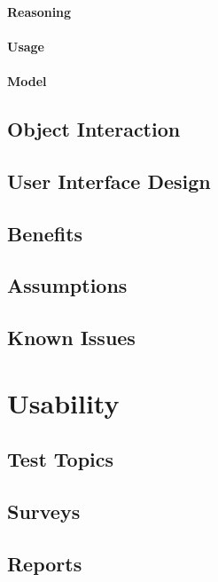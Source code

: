 \subsubsection{Reasoning}

\subsubsection{Usage}

\subsubsection{Model}

\section{Object Interaction}

\section{User Interface Design}

\section{Benefits}

\section{Assumptions}

\section{Known Issues}


\chapter{Usability}

\section{Test Topics}

\section{Surveys}

\section{Reports}

